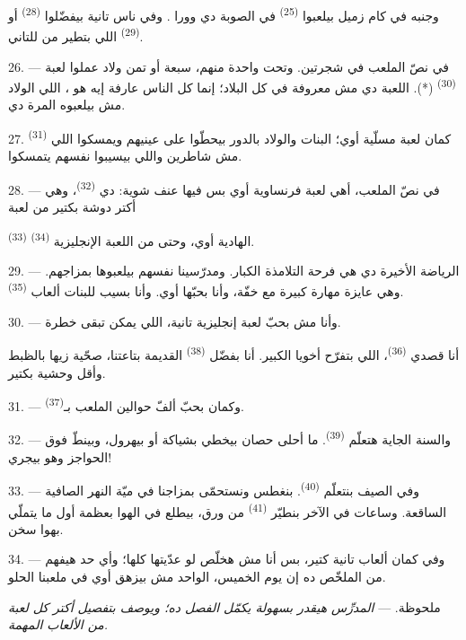 وجنبه في كام زميل بيلعبوا \textsuperscript{(25)} في الصوبة دي وورا
. وفي ناس تانية بيفضّلوا \textsuperscript{(28)} أو
\textsuperscript{(29)} اللي بتطير من  للتاني.

26. --- في نصّ الملعب في شجرتين. وتحت واحدة منهم، سبعة أو تمن ولاد عملوا لعبة
\textsuperscript{(30)} (*). اللعبة دي مش معروفة في كل
البلاد؛ إنما كل الناس عارفة إيه هو ، اللي الولاد مش
بيلعبوه المرة دي.

\VUsaut{5.0mm}
\VUsaut{3.4mm}

27. \textsuperscript{(31)} كمان لعبة مسلّية أوي؛ البنات والولاد
بالدور بيحطّوا  على عينيهم ويمسكوا اللي مش شاطرين واللي بيسيبوا
نفسهم يتمسكوا.

28. --- في نصّ الملعب، أهي لعبة فرنساوية أوي بس فيها عنف شوية: دي
\textsuperscript{(32)}، وهي أكتر دوشة بكتير من لعبة

\textsuperscript{(33)} الهادية أوي، وحتى من اللعبة الإنجليزية
\textsuperscript{(34)}.

29. --- الرياضة الأخيرة دي هي فرحة التلامذة الكبار. ومدرّسينا نفسهم بيلعبوها
بمزاجهم. وهي عايزة مهارة كبيرة مع خفّة، وأنا بحبّها أوي. وأنا بسيب للبنات
ألعاب \textsuperscript{(35)}.

30. --- وأنا مش بحبّ لعبة إنجليزية تانية، اللي يمكن تبقى خطرة.

أنا قصدي \textsuperscript{(36)}، اللي بتفرّح أخويا الكبير. أنا
بفضّل \textsuperscript{(38)} القديمة بتاعتنا، صحّية زيها بالظبط
وأقل وحشية بكتير.

\VUsaut{4.6mm}
\VUsaut{3.0mm}

31. --- وكمان بحبّ ألفّ حوالين الملعب بـ\textsuperscript{(37)}.

32. --- والسنة الجاية هتعلّم \textsuperscript{(39)}. ما أحلى حصان
بيخطي بشياكة أو بيهرول، وبينطّ فوق الحواجز وهو بيجري!

33. --- وفي الصيف بنتعلّم \textsuperscript{(40)}. بنغطس ونستحمّى بمزاجنا
في ميّة النهر الصافية الساقعة. وساعات في الآخر بنطيّر \textsuperscript{(41)}
من ورق، بيطلع في الهوا بعظمة أول ما يتملّي بهوا سخن.

34. --- وفي كمان ألعاب تانية كتير، بس أنا مش هخلّص لو عدّيتها كلها؛ وأي حد
هيفهم من الملخّص ده إن يوم الخميس، الواحد مش بيزهق أوي في ملعبنا الحلو.

ملحوظة. --- \textit{المدرِّس هيقدر بسهولة يكمّل الفصل ده؛ ويوصف بتفصيل أكتر كل
لعبة من الألعاب المهمة.}
